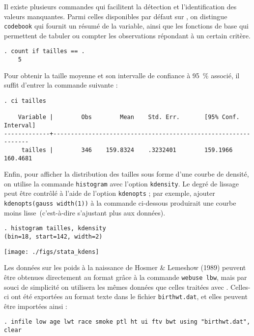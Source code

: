 Il existe plusieurs commandes qui facilitent la détection et
l'identification des valeurs manquantes. Parmi celles disponibles par défaut
sur \Stata, on distingue \verb|codebook| qui fournit un résumé de la
variable, ainsi que les fonctions de base qui permettent de tabuler ou
compter les observations répondant à un certain critère.
\begin{verbatim}
. count if tailles == .
    5
\end{verbatim}

Pour obtenir la taille moyenne et son intervalle de confiance à 95~\%
associé, il suffit d'entrer la commande suivante :
\begin{verbatim}
. ci tailles

    Variable |        Obs        Mean    Std. Err.       [95% Conf. Interval]
-------------+---------------------------------------------------------------
     tailles |        346    159.8324    .3232401        159.1966    160.4681
\end{verbatim}

Enfin, pour afficher la distribution des tailles sous forme d'une courbe de
densité, on utilise la commande \texttt{histogram} avec l'option
\texttt{kdensity}. Le degré de lissage peut être contrôlé à l'aide de
l'option \texttt{kdenopts} ; par exemple, ajouter \verb|kdenopts(gauss width(1))| 
à la commande ci-dessous produirait une courbe \og moins lisse\fg\
(c'est-à-dire s'ajustant plus aux données).
\begin{verbatim}
. histogram tailles, kdensity
(bin=18, start=142, width=2)
\end{verbatim}

\texttt{[image: ./figs/stata\_kdens]}

%
%
%
\soln{\ref{exo:8.6}} Les données sur les poids à la naissance de Hosmer \&
Lemeshow (1989) peuvent être obtenues directement au format \Stata grâce à la
commande \verb|webuse lbw|, mais par souci de simplicité on utilisera les
mêmes données que celles traitées avec \R. Celles-ci ont été exportées au
format texte dans le fichier \texttt{birthwt.dat}, et elles peuvent être
importées ainsi : 
\begin{verbatim}
. infile low age lwt race smoke ptl ht ui ftv bwt using "birthwt.dat", clear
\end{verbatim}

